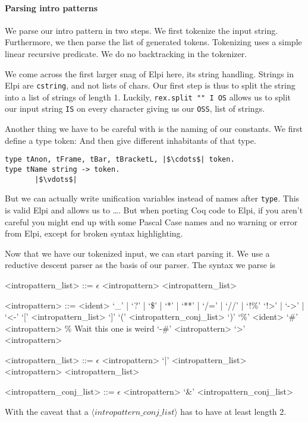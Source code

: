 \documentclass[thesis.tex]{subfiles}
\begin{document}
\paragraph*{Parsing intro patterns}
We parse our intro pattern in two steps. We first tokenize the input string. Furthermore, we then parse the list of generated tokens. Tokenizing uses a simple linear recursive predicate. We do no backtracking in the tokenizer.

We come across the first larger snag of Elpi here, its string handling. Strings in Elpi are \texttt{cstring}, and not lists of chars. Our first step is thus to split the string into a list of strings of length 1. Luckily, \texttt{rex.split "" I OS} allows us to split our input string \texttt{IS} on every character giving us our \texttt{OSS}, list of strings.

Another thing we have to be careful with is the naming of our constants. We first define a type token:  And then give different inhabitants of that type.
\begin{verbatim}
type tAnon, tFrame, tBar, tBracketL, |$\cdots$| token.
type tName string -> token.
       |$\vdots$|
\end{verbatim}
But we can actually write unification variables instead of names after \texttt{type}. This is valid Elpi and allows us to \dots. But when porting Coq code to Elpi, if you aren't careful you might end up with some Pascal Case names and no warning or error from Elpi, except for broken syntax highlighting.

Now that we have our tokenized input, we can start parsing it. We use a reductive descent parser as the basis of our parser. The syntax we parse is
\begin{grammar}
  <intropattern\_list> ::= $\epsilon$
  \alt <intropattern> <intropattern\_list>

  <intropattern> ::= <ident>
  \alt `_' | `?' | `\$' | `*' | `**' | `/=' | `//' | `!\%'
  \alt `!>' | `->' | `<-'
  \alt `[' <intropattern\_list> `]'
  \alt `(' <intropattern\_conj\_list> `)'
  \alt `\%' <ident>
  \alt `#' <intropattern> \% Wait this one is weird
  \alt `-#' <intropattern>
  \alt `>' <intropattern>

  <intropattern\_list> ::= $\epsilon$
  \alt <intropattern> `|' <intropattern\_list>
  \alt <intropattern> <intropattern\_list>

  <intropattern\_conj\_list> ::= $\epsilon$
  \alt <intropattern> `&' <intropattern\_conj\_list>
\end{grammar}
With the caveat that a $\langle intropattern\_conj\_list\rangle$ has to have at least length 2.
\end{document}

